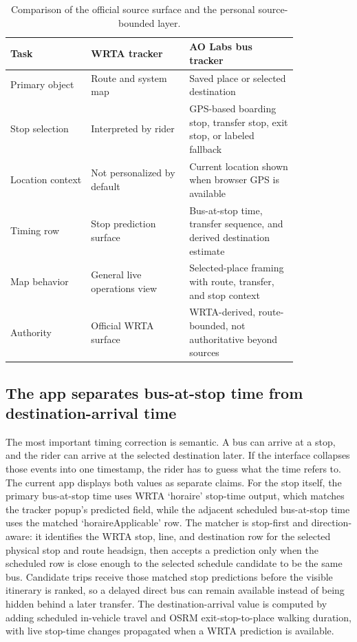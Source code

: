 \documentclass[12pt,letterpaper]{article}
\begin{document}
\begin{table}[H]
\centering
\small
\caption{Comparison of the official source surface and the personal source-bounded layer.}
\begin{tabular}{L{0.23\linewidth}L{0.29\linewidth}L{0.31\linewidth}}
\toprule
Task & WRTA tracker & AO Labs bus tracker \\
\midrule
Primary object & Route and system map & Saved place or selected destination \\
Stop selection & Interpreted by rider & GPS-based boarding stop, transfer stop, exit stop, or labeled fallback \\
Location context & Not personalized by default & Current location shown when browser GPS is available \\
Timing row & Stop prediction surface & Bus-at-stop time, transfer sequence, and derived destination estimate \\
Map behavior & General live operations view & Selected-place framing with route, transfer, and stop context \\
Authority & Official WRTA surface & WRTA-derived, route-bounded, not authoritative beyond sources \\
\bottomrule
\end{tabular}
\end{table}

\subsection{The app separates bus-at-stop time from destination-arrival time}

The most important timing correction is semantic. A bus can arrive at a stop, and the rider can arrive at the selected destination later. If the interface collapses those events into one timestamp, the rider has to guess what the time refers to. The current app displays both values as separate claims. For the stop itself, the primary bus-at-stop time uses WRTA `horaire' stop-time output, which matches the tracker popup's predicted field, while the adjacent scheduled bus-at-stop time uses the matched `horaireApplicable' row. The matcher is stop-first and direction-aware: it identifies the WRTA stop, line, and destination row for the selected physical stop and route headsign, then accepts a prediction only when the scheduled row is close enough to the selected schedule candidate to be the same bus. Candidate trips receive those matched stop predictions before the visible itinerary is ranked, so a delayed direct bus can remain available instead of being hidden behind a later transfer. The destination-arrival value is computed by adding scheduled in-vehicle travel and OSRM exit-stop-to-place walking duration, with live stop-time changes propagated when a WRTA prediction is available.
\end{document}
